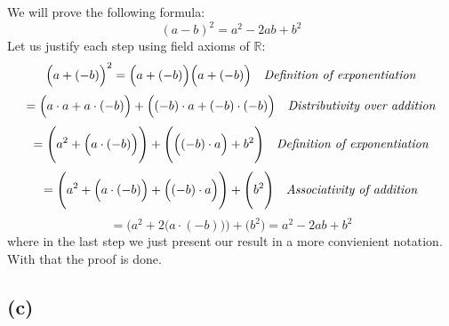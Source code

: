 \documentclass{article}
\begin{document}
We will prove the following formula:
\begin{equation*}
    (a - b)^2 = a^2 - 2ab + b^2
\end{equation*}
Let us justify each step using field axioms of \(\mathbb{R}\):
\begin{equation*}
    \Big(a + (-b)\Big)^2 = \Big(a + (-b)\Big) \Big(a + (-b)\Big) \ \ \ \mbox{\emph{Definition of exponentiation}}
\end{equation*}
\begin{equation*}
    = \Big(a \cdot a + a \cdot (-b)\Big) + \Big((-b) \cdot a + (-b) \cdot (-b)\Big) \ \ \ \mbox{\emph{Distributivity over addition}}
\end{equation*}
\begin{equation*}
    = \Bigg(a^2 + \Big(a \cdot (-b)\Big)\Bigg) + \Bigg(\Big( (-b) \cdot a \Big) + b^2 \Bigg) \ \ \ \mbox{\emph{Definition of exponentiation}}
\end{equation*}
\begin{equation*}
    =   \Bigg(a^2 + \Big(a \cdot (-b)\Big) + \Big( (-b) \cdot a \Big) \Bigg) + \Bigg(b^2 \Bigg) \ \ \ \mbox{\emph{Associativity of addition}}
\end{equation*}
\begin{equation*}
    = \Bigg(a^2 + 2 \Big(a \cdot (-b)\Big) \Bigg) + \Bigg(b^2 \Bigg) = a^2 -2ab + b^2
\end{equation*}
where in the last step we just present our result in a more convienient notation. With that the proof is done.


\subsection*{(c)}
\end{document}
